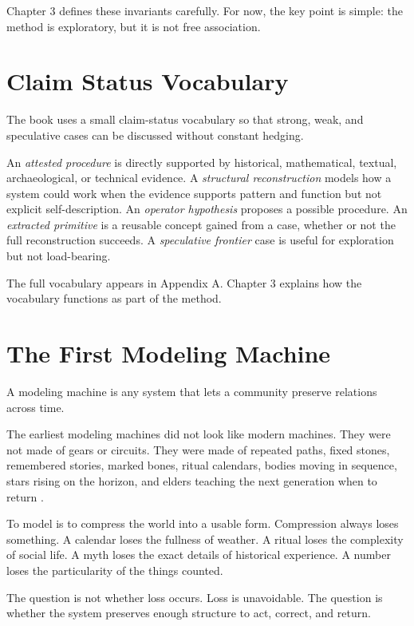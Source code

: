 \documentclass[11pt]{book}
\begin{document}
Chapter 3 defines these invariants carefully. For now, the key point is simple: the method is exploratory, but it is not free association.

\section{Claim Status Vocabulary}

The book uses a small claim-status vocabulary so that strong, weak, and speculative cases can be discussed without constant hedging.

An \emph{attested procedure} is directly supported by historical, mathematical, textual, archaeological, or technical evidence. A \emph{structural reconstruction} models how a system could work when the evidence supports pattern and function but not explicit self-description. An \emph{operator hypothesis} proposes a possible procedure. An \emph{extracted primitive} is a reusable concept gained from a case, whether or not the full reconstruction succeeds. A \emph{speculative frontier} case is useful for exploration but not load-bearing.

The full vocabulary appears in Appendix A. Chapter 3 explains how the vocabulary functions as part of the method.

\section{The First Modeling Machine}

A modeling machine is any system that lets a community preserve relations across time.

The earliest modeling machines did not look like modern machines. They were not made of gears or circuits. They were made of repeated paths, fixed stones, remembered stories, marked bones, ritual calendars, bodies moving in sequence, stars rising on the horizon, and elders teaching the next generation when to return \cite{Ruggles1999AstronomyPrehistoricBritain,Ruggles2005AncientAstronomy,Krupp1994EchoesAncientSkies,Aveni2001Skywatchers}.

To model is to compress the world into a usable form. Compression always loses something. A calendar loses the fullness of weather. A ritual loses the complexity of social life. A myth loses the exact details of historical experience. A number loses the particularity of the things counted.

The question is not whether loss occurs. Loss is unavoidable. The question is whether the system preserves enough structure to act, correct, and return.
\end{document}
